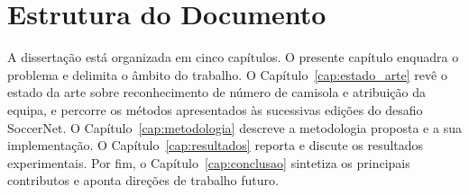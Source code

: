 \section{Estrutura do Documento}\label{sec:estrutura}

A dissertação está organizada em cinco capítulos. O presente capítulo enquadra o problema e delimita
o âmbito do trabalho. O Capítulo~\ref{cap:estado_arte} revê o estado da arte sobre reconhecimento de
número de camisola e atribuição da equipa, e percorre os métodos apresentados às sucessivas edições
do desafio SoccerNet. O Capítulo~\ref{cap:metodologia} descreve a metodologia proposta e a sua
implementação. O Capítulo~\ref{cap:resultados} reporta e discute os resultados experimentais. Por
fim, o Capítulo~\ref{cap:conclusao} sintetiza os principais contributos e aponta direções de
trabalho futuro.